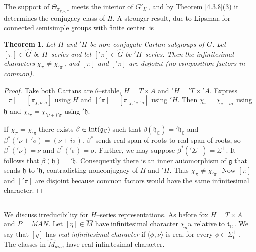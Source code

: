 \documentclass{conm-p-l}
\newtheorem{theorem}[equation]{Theorem}
\renewcommand{\gg}{\mathfrak{g}}
\def\gg{\mathfrak{g}}
\def\gh{\mathfrak{h}}
\def\gt{\mathfrak{t}}
\def\Int{{\rm Int}}
\def\C{\mathbb{C}}
\begin{document}
The support of $\Theta_{\pi_{\chi,\nu,\sigma}}$ meets the interior of
$G'_H$\,, and by Theorem \ref{4.3.8}(3) it determines the conjugacy
class of $H$.  A stronger result, due to Lipsman \cite[Theorem 11.1]{L1971}
for connected semisimple groups with finite center, is
\begin{theorem}\label{4.4.6}
Let $H$ and $'H$ be non--conjugate Cartan subgroups of $G$.  Let 
$[\pi] \in \widehat{G}$ be $H$--series and let $['\pi] \in \widehat{G}$ 
be $'H$--series.  Then the infinitesimal characters 
$\chi_\pi \ne \chi_{'\pi}$\,, and $[\pi]$ and $['\pi]$ are disjoint
(no composition factors in common).
\end{theorem}

\begin{proof}
Take both Cartans are $\theta$--stable, $H = T \times A$
and $'H = {'T} \times {'A}$.  Express $[\pi] = [\pi_{\chi,\nu,\sigma}]$
using $H$ and $[{'\pi}] = [\pi_{{'\chi},{'\nu},{'\sigma}}]$ using $'H$.
Then $\chi_\pi = \chi_{\nu + i\sigma}$ using $\gh$ and
$\chi_{'\pi} = \chi_{{'\nu} +i {'\sigma}}$ using $'\gh$.

If $\chi_\pi = \chi_{'\pi}$ there exists $\beta \in \Int(\gg_\C)$ such
that $\beta(\gh_\C) = {'\gh}_\C$ and $\beta^*({'\nu}+{'\sigma})
= (\nu + i\sigma)$.  $\beta^*$ sends real span of roots to real span
of roots, so $\beta^*({'\nu}) = \nu$ and $\beta^*({'\sigma}) = \sigma$.
Further, we may suppose $\beta^*('\Sigma^+) = \Sigma^+$.  It follows
that $\beta(\gh) = {'\gh}$.  Consequently \cite[Corollary 2.4]{R1972}
there is an inner automorphism of $\gg$ that sends $\gh$ to $'\gh$,
contradicting nonconjugacy of $H$ and $'H$.  Thus
$\chi_\pi \ne \chi_{'\pi}$\,.  Now $[\pi]$ and
$[{'\pi}]$ are disjoint because common factors would have the same 
infinitesimal character.
\end{proof}

\subsection{}\label{ssec4f}\setcounter{equation}{0}
We discuss irreducibility for $H$--series representations.  As before
fox $H=T\times A$ and $P = MAN$.  Let 
$[\eta] \in \widehat{M}$ have infinitesimal character $\chi_nu$ relative 
to $\gt_\C$\,.  We say that $[\eta]$ has {\em real infinitesimal
character} if $\langle\phi,\nu\rangle$ is real for every 
$\phi \in \Sigma_\gt^+$\,.  The classes in $\widehat{M}_{disc}$ have
real infinitesimal character.
\end{document}
